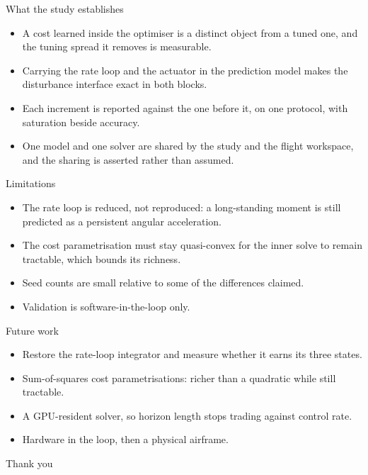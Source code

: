 \documentclass[10pt]{beamer}
\begin{document}
\begin{frame}{What the study establishes}
  \begin{itemize}
    \item A cost learned inside the optimiser is a distinct object from a
      tuned one, and the tuning spread it removes is measurable.
    \item Carrying the rate loop and the actuator in the prediction model
      makes the disturbance interface exact in both blocks.
    \item Each increment is reported against the one before it, on one
      protocol, with saturation beside accuracy.
    \item One model and one solver are shared by the study and the flight
      workspace, and the sharing is asserted rather than assumed.
  \end{itemize}
\end{frame}

\begin{frame}{Limitations}
  \begin{itemize}
    \item The rate loop is reduced, not reproduced: a long-standing moment is
      still predicted as a persistent angular acceleration.
    \item The cost parametrisation must stay quasi-convex for the inner solve
      to remain tractable, which bounds its richness.
    \item Seed counts are small relative to some of the differences claimed.
    \item Validation is software-in-the-loop only.
  \end{itemize}
\end{frame}

\begin{frame}{Future work}
  \begin{itemize}
    \item Restore the rate-loop integrator and measure whether it earns its
      three states.
    \item Sum-of-squares cost parametrisations: richer than a quadratic while
      still tractable.
    \item A GPU-resident solver, so horizon length stops trading against
      control rate.
    \item Hardware in the loop, then a physical airframe.
  \end{itemize}
\end{frame}

\begin{frame}
  \centering
  \Large Thank you
\end{frame}
\end{document}
